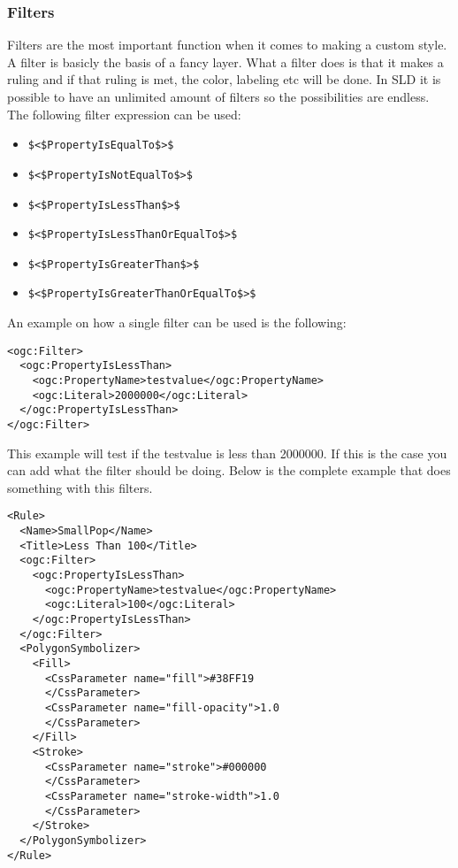 \subsubsection{Filters}

Filters are the most important function when it comes to making a custom style. A filter is basicly the basis of a fancy layer. What a filter does is that it makes a ruling and if that ruling is met, the color, labeling etc will be done. In SLD it is possible to have an unlimited amount of filters so the possibilities are endless. The following filter expression can be used:

\begin{itemize}
	\item \lstinline|$<$PropertyIsEqualTo$>$|
	\item \lstinline|$<$PropertyIsNotEqualTo$>$|
	\item \lstinline|$<$PropertyIsLessThan$>$|
	\item \lstinline|$<$PropertyIsLessThanOrEqualTo$>$|
	\item \lstinline|$<$PropertyIsGreaterThan$>$|
	\item \lstinline|$<$PropertyIsGreaterThanOrEqualTo$>$|
\end{itemize}

An example on how a single filter can be used is the following:
\begin{lstlisting}
<ogc:Filter>
  <ogc:PropertyIsLessThan>
    <ogc:PropertyName>testvalue</ogc:PropertyName>
    <ogc:Literal>2000000</ogc:Literal>
  </ogc:PropertyIsLessThan>
</ogc:Filter>
\end{lstlisting}

This example will test if the testvalue is less than 2000000. If this is the case you can add what the filter should be doing. Below is the complete example that does something with this filters.
\begin{lstlisting}
<Rule>
  <Name>SmallPop</Name>
  <Title>Less Than 100</Title>
  <ogc:Filter>
    <ogc:PropertyIsLessThan>
      <ogc:PropertyName>testvalue</ogc:PropertyName>
      <ogc:Literal>100</ogc:Literal>
    </ogc:PropertyIsLessThan>
  </ogc:Filter>
  <PolygonSymbolizer>
    <Fill>
      <CssParameter name="fill">#38FF19
      </CssParameter>
      <CssParameter name="fill-opacity">1.0
      </CssParameter>
    </Fill>
    <Stroke>
      <CssParameter name="stroke">#000000
      </CssParameter>
      <CssParameter name="stroke-width">1.0
      </CssParameter>
    </Stroke>
  </PolygonSymbolizer>
</Rule>
\end{lstlisting}

